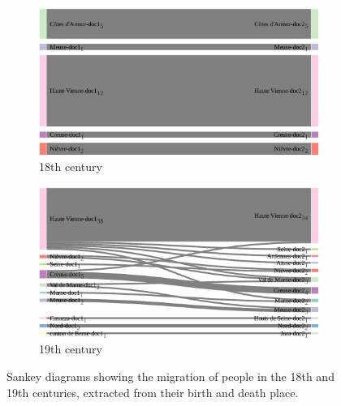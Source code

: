 \begin{figure}
    \centering

    \begin{subfigure}{0.49\linewidth}
        \includegraphics[width=\textwidth]{static/figures/ComBiNet/OriginalPaperFigures/CGF/frenchGenealogy/migration_18.pdf}
        \caption{18th century}
    \end{subfigure}
    \begin{subfigure}{0.49\linewidth}
        \includegraphics[width=\textwidth]{static/figures/ComBiNet/OriginalPaperFigures/CGF/frenchGenealogy/migration_19.pdf}
        \caption{19th century}
    \end{subfigure}

    \caption{Sankey diagrams showing the migration of people in the 18th and 19th centuries, extracted from their birth and death place.}\label{fig:useCaseNicole2}
\end{figure}



